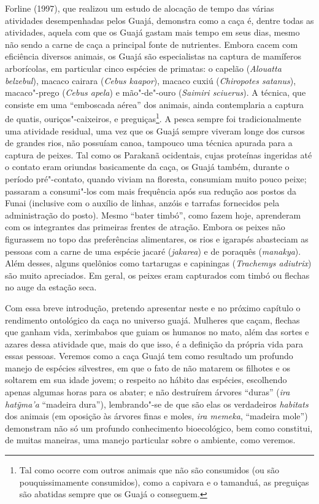 Forline (1997), que realizou um estudo de alocação de tempo das várias
atividades desempenhadas pelos Guajá, demonstra como a caça é, dentre
todas as atividades, aquela com que os Guajá gastam mais tempo em seus
dias, mesmo não sendo a carne de caça a principal fonte de nutrientes.
Embora cacem com eficiência diversos animais, os Guajá são especialistas
na captura de mamíferos arborícolas, em particular cinco espécies de
primatas: o capelão (\emph{Alouatta belzebul}), macaco cairara
(\emph{Cebus kaapor}), macaco cuxiú (\emph{Chiropotes satanus}),
macaco"-prego (\emph{Cebus apela}) e mão"-de"-ouro (\emph{Saimiri
sciuerus}). A técnica, que consiste em uma ``emboscada aérea'' dos
animais, ainda contemplaria a captura de quatis, ouriços"-caixeiros, e
preguiças\footnote{Tal como ocorre com outros animais que não são
  consumidos (ou são pouquissimamente consumidos), como a capivara e o
  tamanduá, as preguiças são abatidas sempre que os Guajá o conseguem.}.
A pesca sempre foi tradicionalmente uma atividade residual, uma vez que
os Guajá sempre viveram longe dos cursos de grandes rios, não possuíam
canoa, tampouco uma técnica apurada para a captura de peixes. Tal como
os Parakanã ocidentais, cujas proteínas ingeridas até o contato eram
oriundas basicamente da caça, os Guajá também, durante o período
pré"-contato, quando viviam na floresta, consumiam muito pouco peixe;
passaram a consumi"-los com mais frequência após sua redução aos postos
da Funai (inclusive com o auxílio de linhas, anzóis e tarrafas
fornecidos pela administração do posto). Mesmo ``bater timbó'', como
fazem hoje, aprenderam com os integrantes das primeiras frentes de
atração. Embora os peixes não figurassem no topo das preferências
alimentares, os rios e igarapés abasteciam as pessoas com a carne de uma
espécie jacaré (\emph{jakarea}) e de poraquês (\emph{manakya}). Além
desses, alguns quelônios como tartarugas e capiningas (\emph{Trachemys
adiutrix}) são muito apreciados. Em geral, os peixes eram capturados com
timbó ou flechas no auge da estação seca.

Com essa breve introdução, pretendo apresentar neste e no próximo
capítulo o rendimento ontológico da caça no universo guajá. Mulheres que
caçam, flechas que ganham vida, xerimbabos que guiam os humanos no mato,
além das sortes e azares dessa atividade que, mais do que isso, é a
definição da própria vida para essas pessoas. Veremos como a caça Guajá
tem como resultado um profundo manejo de espécies silvestres, em que o
fato de não matarem os filhotes e os soltarem em sua idade jovem; o
respeito ao hábito das espécies, escolhendo apenas algumas horas para os
abater; e não destruírem árvores ``duras'' (\emph{ira hatỹma'a}
``madeira dura''), lembrando"-se de que são elas os verdadeiros
\emph{habitats} dos animais (em oposição às árvores finas e moles,
\emph{ira memeka}, ``madeira mole'') demonstram não só um profundo
conhecimento bioecológico, bem como constitui, de muitas maneiras, uma
manejo particular sobre o ambiente, como veremos.

